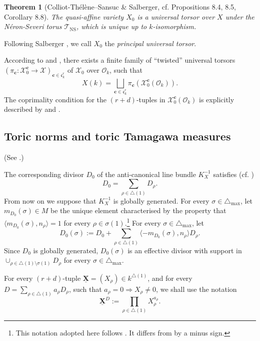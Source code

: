 \documentclass[11pt,letterpaper]{amsart}
\newcommand{\CO}{{\mathcal {O}}}
\newcommand{\CX}{{\mathcal {X}}}
\newcommand{\XX}{\underline{\mathbf{X}}}
\theoremstyle{plain}
\numberwithin{equation}{section}
\newtheorem{theorem}{Theorem}[section]
\theoremstyle{definition}
\theoremstyle{remark}
\begin{document}
\begin{theorem}[Colliot-Thélène--Sansuc \& Salberger, cf. \cite{Salberger} Propositions 8.4, 8.5, Corollary 8.8]\label{thm:univtor}
The quasi-affine variety $X_0$ is a universal torsor over $X$ under the	N\'eron-Severi torus $\mathcal{T}_{\operatorname{NS}}$, which is unique up to $k$-isomorphism.
\end{theorem}
Following Salberger \cite[p. 191]{Salberger}, we call $X_0$ the \emph{principal universal torsor}.

According to \cite[Theorem 3.2]{Huang} and \cite[p. 419]{Pieropan}, there exists a finite family of ``twisted'' universal torsors 
$(\pi_{\mathbf{c}}:\CX_0^{\mathbf{c}}\to\CX)_{\mathbf{c}\in\mathfrak{c}_k^r}$ of $\CX_0$ over $\CO_k$, such that $$X(k)=\bigsqcup_{\mathbf{c}\in\mathfrak{c}_k^r}\pi_{\mathbf{c}}\left(\CX_0^{\mathbf{c}}(\CO_k)\right).$$ The coprimality condition for the $(r+d)$-tuples in $\CX_0^{\mathbf{c}}(\CO_k)$ is explicitly described by \cite[Theorem 2.7]{Frei-Pieropan} and \cite[(26)]{Huang}.
\subsection{Toric norms and toric Tamagawa measures}
(See \cite[\S9]{Salberger}.)

The corresponding divisor $D_0$ of the anti-canonical line bundle $K_X^{-1}$ satisfies (cf. \cite[Theorem 8.2.3]{Coxbook}) $$D_0=\sum_{\rho\in\triangle(1)}D_{\rho}.$$ 
From now on we suppose that $K_X^{-1}$ is globally generated. 
For every $\sigma\in\triangle_{\max}$, let $m_{D_0}(\sigma)\in M$ be the unique element characterised by the property that $\langle m_{D_0}(\sigma),n_\rho\rangle=1$ for every $\rho\in\sigma(1)$.\footnote{This notation adopted here follows \cite{Salberger}. It differs from \cite{Huang} by a minus sign.} 
For every $\sigma\in\triangle_{\max}$, let \begin{equation}\label{eq:D0sigma}
	D_0(\sigma):=D_0+\sum_{\rho\in\triangle(1)}\langle -m_{D_0}(\sigma),n_{\rho}\rangle D_{\rho}.
\end{equation} Since $D_0$ is globally generated, $D_0(\sigma)$ is an effective divisor with support in $\cup_{\rho\in\triangle(1)\setminus\sigma(1)} D_\rho$ for every $\sigma\in\triangle_{\max}$.

For every $(r+d)$-tuple $\XX=(X_\rho)\in k^{\triangle(1)}$, and for every $D=\sum_{\rho\in\triangle(1)}a_\rho D_\rho$, such that $a_\rho=0\Rightarrow X_\rho\neq 0$, we shall use the notation
\begin{equation}\label{eq:XP0}
	\XX^{D}:=\prod_{\rho\in\triangle(1)}X_\rho^{a_{\rho}}.
\end{equation}
\end{document}
